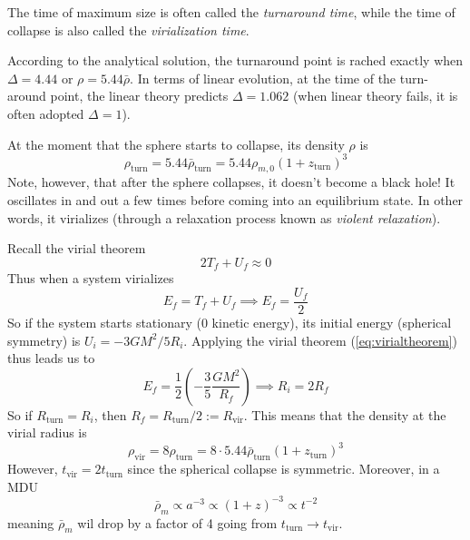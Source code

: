 The time of maximum size is often called the \emph{turnaround time}, while the time of collapse is also called the \emph{virialization time}.
\par According to the analytical solution, the turnaround point is rached exactly when $\Delta = 4.44$ or $\rho = 5.44\bar{\rho}$. In terms of linear evolution, at the time of the turn-around point, the linear theory predicts $\Delta = 1.062$ (when linear theory fails, it is often adopted $\Delta = 1$).
\par At the moment that the sphere starts to collapse, its density $\rho$ is 
\begin{equation*}
    \rho_{\text{turn}} = 5.44\bar{\rho}_{\text{turn}} = 5.44\rho_{m,0}(1+z_{\text{turn}})^{3}
\end{equation*}
Note, however, that after the sphere collapses, it doesn’t become a black hole! It oscillates in and out a few times before coming into an equilibrium state. In other words, it virializes (through a relaxation process known as \emph{violent relaxation}).
\par Recall the virial theorem
\begin{equation}
    2T_{f} + U_{f} \approx 0 
    \label{eq:virialtheorem}
\end{equation}
Thus when a system virializes
\begin{equation*}
    E_{f} = T_{f}+U_{f}\implies E_{f} = \frac{U_{f}}{2}
\end{equation*}
So if the system starts stationary (0 kinetic energy), its initial energy (spherical
symmetry) is $U_{i} = -3GM^{2}/5R_{i}$. Applying the virial theorem (\ref{eq:virialtheorem}) thus leads us to
\begin{equation*}
    E_{f} = \frac{1}{2}\left(-\frac{3}{5}\frac{GM^{2}}{R_{f}}\right) \implies R_{i} = 2R_{f}
\end{equation*}
So if $R_{\text{turn}} = R_{i}$, then $R_{f} = R_{\text{turn}}/2 := R_{\text{vir}}$. This means that the density at the virial radius is 
\begin{equation*}
    \rho_{\text{vir}} = 8\rho_{\text{turn}} = 8\cdot 5.44\bar{\rho}_{\text{turn}}(1+z_{\text{turn}})^{3}
\end{equation*}
However, $t_{\text{vir}} = 2t_{\text{turn}}$ since the spherical collapse is symmetric. Moreover, in a MDU
\begin{equation*}
    \bar{\rho}_{m} \propto a^{-3} \propto (1+z)^{-3} \propto t^{-2}
\end{equation*}
meaning $\bar{\rho}_{m}$ wil drop by a factor of 4 going from $t_{\text{turn}} \to t_{\text{vir}}$.
